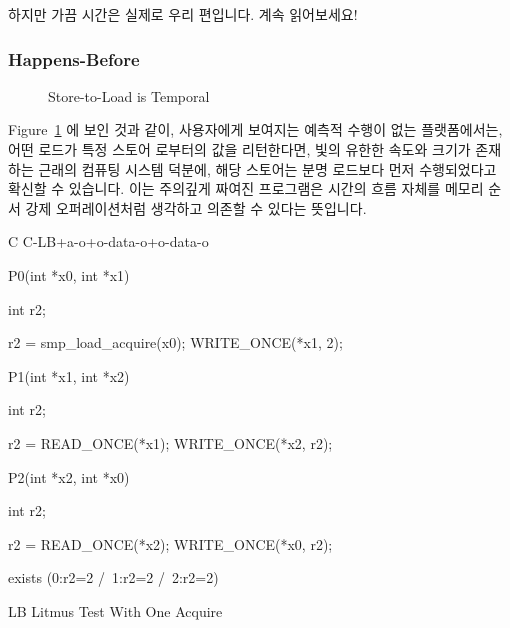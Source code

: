 하지만 가끔 시간은 실제로 우리 편입니다.  계속 읽어보세요!

\subsubsection{Happens-Before}
\label{sec:memorder:Happens-Before}

\begin{figure}[tbp]
\centering
{}
\caption{Store-to-Load is Temporal}
\label{fig:memorder:Store-to-Load is Temporal}
\end{figure}

Figure~\ref{fig:memorder:Store-to-Load is Temporal}
에 보인 것과 같이, 사용자에게 보여지는 예측적 수행이 없는 플랫폼에서는, 어떤
로드가 특정 스토어 로부터의 값을 리턴한다면, 빛의 유한한 속도와 크기가 존재하는
근래의 컴퓨팅 시스템 덕분에, 해당 스토어는 분명 로드보다 먼저 수행되었다고
확신할 수 있습니다.
이는 주의깊게 짜여진 프로그램은 시간의 흐름 자체를 메모리 순서 강제
오퍼레이션처럼 생각하고 의존할 수 있다는 뜻입니다.

\begin{listing}[tbp]
{ \scriptsize
\begin{verbbox}[\LstLineNo]
C C-LB+a-o+o-data-o+o-data-o
{
}

P0(int *x0, int *x1)
{
  int r2;

  r2 = smp_load_acquire(x0);
  WRITE_ONCE(*x1, 2);
}


P1(int *x1, int *x2)
{
  int r2;

  r2 = READ_ONCE(*x1);
  WRITE_ONCE(*x2, r2);
}

P2(int *x2, int *x0)
{
  int r2;

  r2 = READ_ONCE(*x2);
  WRITE_ONCE(*x0, r2);
}

exists (0:r2=2 /\ 1:r2=2 /\ 2:r2=2)
\end{verbbox}
}
\centering
\theverbbox
\caption{LB Litmus Test With One Acquire}
\label{lst:memorder:LB Litmus Test With One Acquire}
\end{listing}

